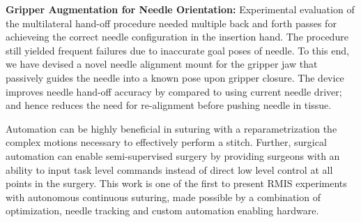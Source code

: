 \noindent \textbf{Gripper Augmentation for Needle Orientation: }
Experimental evaluation of the multilateral hand-off procedure needed multiple back and forth passes for achieveing the correct needle configuration in the insertion hand. The procedure still yielded frequent failures due to inaccurate goal poses of needle. To this end, we have devised a novel needle alignment mount for the gripper jaw that passively guides the needle into a known pose upon gripper closure. The device improves needle hand-off accuracy by  compared to using current needle driver; and hence reduces the need for re-alignment before pushing needle in tissue.  

Automation can be highly beneficial in suturing with a reparametrization the complex motions necessary to effectively perform a stitch. Further, surgical automation can enable semi-supervised surgery by providing surgeons with an ability to input task level commands instead of direct low level control at all points in the surgery. This work is one of the first to present RMIS experiments with autonomous continuous suturing, made possible by a combination of optimization, needle tracking and custom automation enabling hardware.








